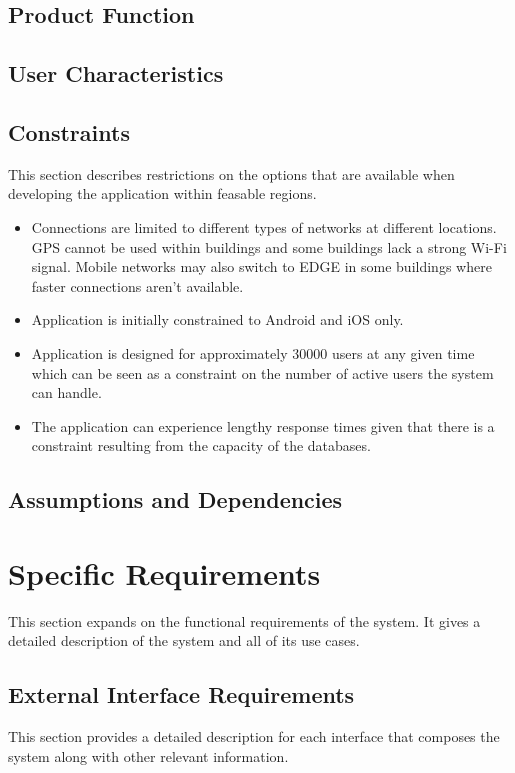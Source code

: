 \documentclass{article}
\begin{document}
	\subsection{Product Function}
	\subsection{User Characteristics}
	\subsection{Constraints}
	This section describes restrictions on the options that are available when developing the application within feasable regions.
		\begin{itemize}
			\item Connections are limited to different types of networks at different locations. GPS cannot be used within buildings and some buildings lack a strong Wi-Fi signal. Mobile networks may also switch to EDGE in some buildings where faster connections aren't available.
			\item Application is initially constrained to Android and iOS only.
			\item Application is designed for approximately 30000 users at any given time which can be seen as a constraint on the number of active users the system can handle.
			\item The application can experience lengthy response times given that there is a constraint resulting from the capacity of the databases.\newline
		\end{itemize}
	
	\subsection{Assumptions and Dependencies}
	
	\section{Specific Requirements}
	This section expands on the functional requirements of the system. It gives a detailed 	description of the system and all of its use cases.
	
	\subsection{External Interface Requirements}
	This section provides a detailed description for each interface that composes the system along with other relevant information.
\end{document}
